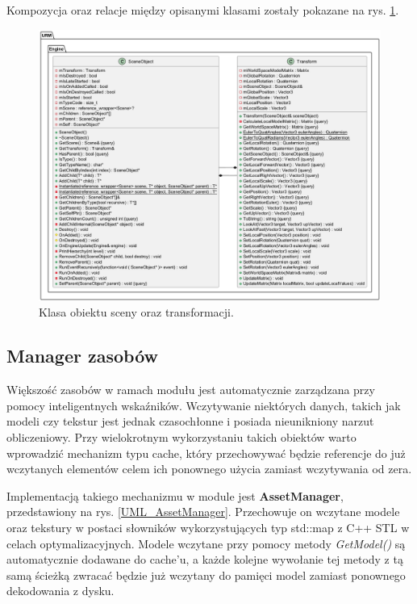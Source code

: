 	Kompozycja oraz relacje między opisanymi klasami zostały pokazane na rys. \ref{UML_SceneObject}.
	
	\vfill
	\clearpage
	
	\begin{figure}[h!]
		\centering
		\includegraphics[width=\textwidth]{images/UML/sceneobject.png}
		\caption{Klasa obiektu sceny oraz transformacji.}
		\label{UML_SceneObject}
	\end{figure}
	
\subsection{Manager zasobów}
	Większość zasobów w ramach modułu jest automatycznie zarządzana przy pomocy inteligentnych wskaźników. Wczytywanie niektórych danych, takich jak modeli czy tekstur jest jednak czasochłonne i posiada nieunikniony narzut obliczeniowy. Przy wielokrotnym wykorzystaniu takich obiektów warto wprowadzić mechanizm typu cache, który przechowywać będzie referencje do już wczytanych elementów celem ich ponownego użycia zamiast wczytywania od zera.
	
	Implementacją takiego mechanizmu w module jest \textbf{AssetManager}, przedstawiony na rys. \ref{UML_AssetManager}. Przechowuje on wczytane modele oraz tekstury w postaci słowników wykorzystujących typ std::map z C++ STL w celach optymalizacyjnych. Modele wczytane przy pomocy metody \textit{GetModel()} są automatycznie dodawane do cache'u, a każde kolejne wywołanie tej metody z tą samą ścieżką zwracać będzie już wczytany do pamięci model zamiast ponownego dekodowania z dysku.
	
